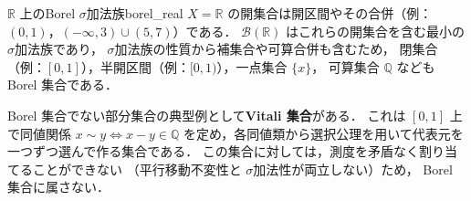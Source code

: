\documentclass[uplatex, dvipdfmx]{jsarticle}
\begin{document}
\begin{example}{$\mathbb{R}$ 上のBorel $\sigma$加法族}{borel_real}
$X=\mathbb{R}$ の開集合は開区間やその合併（例：$(0,1)$，$(-\infty,3)\cup(5,7)$）である．
$\mathcal{B}(\mathbb{R})$ はこれらの開集合を含む最小の $\sigma$加法族であり，
$\sigma$加法族の性質から補集合や可算合併も含むため，
閉集合（例：$[0,1]$），半開区間（例：$[0,1)$），一点集合 $\{x\}$，
可算集合 $\mathbb{Q}$ なども Borel 集合である．
\end{example}

Borel 集合でない部分集合の典型例として\textbf{Vitali 集合}がある．
これは $[0,1]$ 上で同値関係 $x\sim y \Leftrightarrow x-y\in\mathbb{Q}$
を定め，各同値類から選択公理を用いて代表元を一つずつ選んで作る集合である．
この集合に対しては，測度を矛盾なく割り当てることができない
（平行移動不変性と $\sigma$加法性が両立しない）ため，
Borel 集合に属さない．
\end{document}
